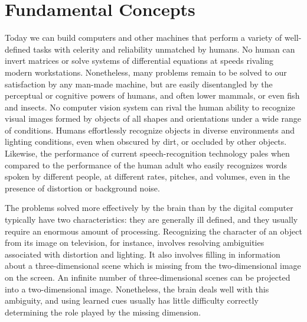 \documentclass[10pt,twocolumn]{article}
\begin{document}
\section{Fundamental Concepts}
Today we can build computers and other machines that perform a variety of
well-defined tasks with celerity and reliability unmatched by humans. No human
can invert matrices or solve systems of differential equations at speeds
rivaling modern workstations. Nonetheless, many problems remain to be solved to
our satisfaction by any man-made machine, but are easily disentangled by the
perceptual or cognitive powers of humans, and often lower mammals, or even fish
and insects. No computer vision system can rival the human ability to recognize
visual images formed by objects of all shapes and orientations under a wide
range of conditions. Humans effortlessly recognize objects in diverse
environments and lighting conditions, even when obscured by dirt, or occluded by
other objects. Likewise, the performance of current speech-recognition
technology pales when compared to the performance of the human adult who easily
recognizes words spoken by different people, at different rates, pitches, and
volumes, even in the presence of distortion or background noise.

The problems solved more effectively by the brain than by the digital computer
typically have two characteristics: they are generally ill defined, and they
usually require an enormous amount of processing. Recognizing the character of
an object from its image on television, for instance, involves resolving
ambiguities associated with distortion and lighting. It also involves filling in
information about a three-dimensional scene which is missing from the
two-dimensional image on the screen. An infinite number of three-dimensional
scenes can be projected into a two-dimensional image. Nonetheless, the brain
deals well with this ambiguity, and using learned cues usually has little
difficulty correctly determining the role played by the missing dimension.
\end{document}

